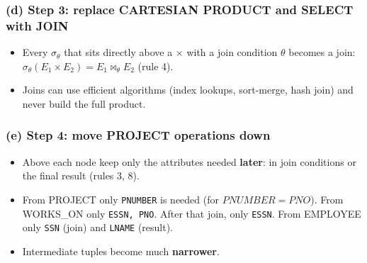 \documentclass[10pt,a4paper]{article}
\newcommand{\aq}{\text{'Aquarius'}}
\newcommand{\bd}{\text{'1957-12-31'}}
\begin{document}
\subsubsection*{(d) Step 3: replace CARTESIAN PRODUCT and SELECT with JOIN}
\begin{minipage}[c]{0.5\linewidth}\centering
{}
\end{minipage}\hfill
\begin{minipage}[c]{0.46\linewidth}
\begin{itemize}
  \item Every $\sigma_{\theta}$ that sits directly above a $\times$ with a join condition $\theta$ becomes a join: $\sigma_\theta(E_1 \times E_2) = E_1 \bowtie_\theta E_2$ (rule 4).
  \item Joins can use efficient algorithms (index lookups, sort-merge, hash join) and never build the full product.
\end{itemize}
\end{minipage}

\subsubsection*{(e) Step 4: move PROJECT operations down}
\begin{minipage}[c]{0.56\linewidth}\centering
{}
\end{minipage}\hfill
\begin{minipage}[c]{0.4\linewidth}
\begin{itemize}
  \item Above each node keep only the attributes needed \textbf{later}: in join conditions or the final result (rules 3, 8).
  \item From PROJECT only \texttt{PNUMBER} is needed (for $PNUMBER=PNO$). From WORKS\_ON only \texttt{ESSN, PNO}. After that join, only \texttt{ESSN}. From EMPLOYEE only \texttt{SSN} (join) and \texttt{LNAME} (result).
  \item Intermediate tuples become much \textbf{narrower}.
\end{itemize}
\end{minipage}
\end{document}

